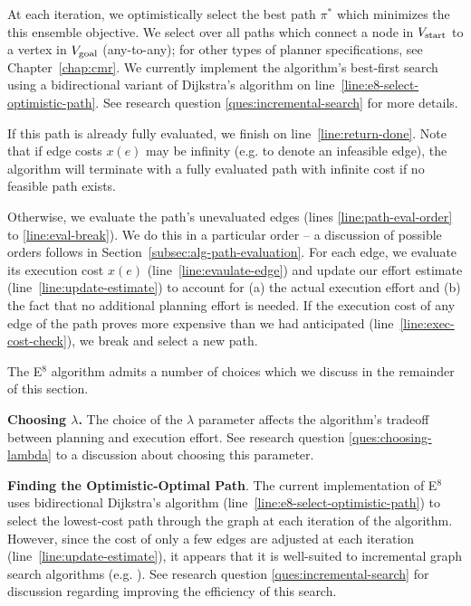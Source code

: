 At each iteration,
we optimistically select the best path $\pi^*$
which minimizes the this ensemble objective.
We select over all paths which connect
a node in $V_{\mbox{\scriptsize start}}$
to a vertex in $V_{\mbox{\scriptsize goal}}$
(any-to-any);
for other types of planner specifications,
see Chapter~\ref{chap:cmr}.
We currently implement the algorithm's best-first search
using a bidirectional variant of
Dijkstra's algorithm \cite{dijkstra1959anote}
on line~\ref{line:e8-select-optimistic-path}.
See research question \ref{ques:incremental-search}
for more details.

If this path is already fully evaluated,
we finish on line~\ref{line:return-done}.
Note that if edge costs $x(e)$ may be infinity
(e.g. to denote an infeasible edge),
the algorithm will terminate with a fully evaluated path
with infinite cost if no feasible path exists.

Otherwise,
we evaluate the path's unevaluated edges
(lines \ref{line:path-eval-order}
to \ref{line:eval-break}).
We do this in a particular order --
a discussion of possible orders follows in 
Section~\ref{subsec:alg-path-evaluation}.
For each edge,
we evaluate its execution cost $x(e)$ (line~\ref{line:evaulate-edge})
and update our effort estimate (line~\ref{line:update-estimate})
to account for (a) the actual execution effort
and (b) the fact that no additional planning effort is needed.
If the execution cost of any edge of the path proves
more expensive than we had anticipated
(line~\ref{line:exec-cost-check}),
we break and select a new path.

The E$^8$ algorithm admits a number of choices
which we discuss in the remainder of this section.

\textbf{Choosing $\lambda$.}
The choice of the $\lambda$ parameter
affects the algorithm's tradeoff between planning and execution effort.
See research question \ref{ques:choosing-lambda}
to a discussion about choosing this parameter.

\textbf{Finding the Optimistic-Optimal Path}.
The current implementation of E$^8$ uses
bidirectional Dijkstra's algorithm
(line~\ref{line:e8-select-optimistic-path})
to select the lowest-cost path through the graph
at each iteration of the algorithm.
However, since the cost of only a few edges
are adjusted at each iteration (line~\ref{line:update-estimate}),
it appears that it is well-suited to incremental
graph search algorithms (e.g. \cite{koenig2004lpastar}).
See research question \ref{ques:incremental-search}
for discussion regarding improving the efficiency of this search.


